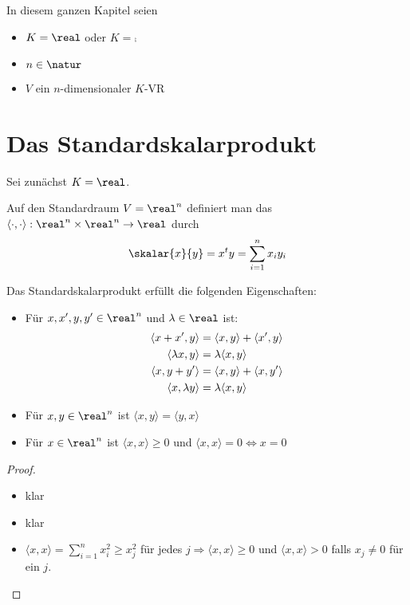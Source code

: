 In diesem ganzen Kapitel seien
\begin{itemize}
	\item $K=\real$ oder $K=\comp$
	\item $n\in\natur$
	\item $V$ ein $n$-dimensionaler $K$-VR
\end{itemize}

\section{Das Standardskalarprodukt}

Sei zunächst $K=\real$.

\begin{definition}
	Auf den Standardraum $V=\real^n$ definiert man das  $\langle\cdot,\cdot\rangle:\real^n\times\real^n\to \real$ durch
	\begin{align}
		\skalar{x}{y}=x^ty=\sum_{i=1}^n x_iy_i\notag
	\end{align}
\end{definition}

\begin{proposition}
	Das Standardskalarprodukt erfüllt die folgenden Eigenschaften:
	\begin{itemize}
		\item Für $x,x',y,y'\in\real^n$ und $\lambda\in\real$ ist:
		\begin{align}
			\langle x+x',y\rangle &= \langle x,y\rangle + \langle x',y\rangle\notag\\
			\langle \lambda x,y\rangle &= \lambda \langle x,y \rangle\notag \\
			\langle x,y+y' \rangle &= \langle x,y \rangle + \langle x,y'\rangle\notag \\
			\langle x,\lambda y \rangle &= \lambda \langle x,y \rangle\notag
		\end{align}
		\item Für $x,y\in\real^n$ ist $\langle x,y \rangle=\langle y,x\rangle$
		\item Für $x\in\real^n$ ist $\langle x,x \rangle\ge 0$ und $\langle x,x\rangle=0\iff x=0$
	\end{itemize}
\end{proposition}
\begin{proof}
	\begin{itemize}
		\item klar
		\item klar
		\item $\langle x,x\rangle=\sum_{i=1}^n x_i^2\ge x_j^2$ für jedes $j\Rightarrow \langle x,x\rangle\ge 0$ und $\langle x,x \rangle>0$ falls $x_j\neq 0$ für ein $j$.
	\end{itemize}
\end{proof}

